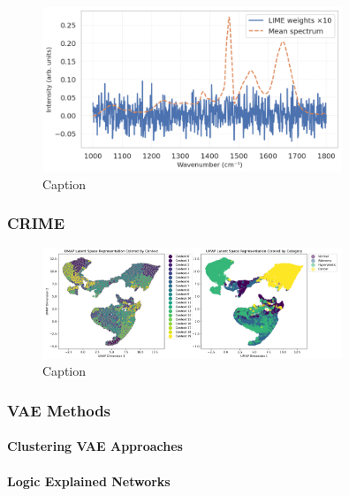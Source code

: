 \begin{figure}[htbp]
  \centering
  \includegraphics[width=0.8\textwidth]{Images/lime_demo.png}
  \caption{Caption}
  \label{fig:my-label}
\end{figure}

\subsubsection{CRIME}
\begin{figure}[htbp]
  \centering
  \includegraphics[width=0.8\textwidth]{Images/crime_umap.png}
  \caption{Caption}
  \label{fig:my-label}
\end{figure}
\subsubsection{VAE Methods}
\paragraph{Clustering VAE Approaches}
\paragraph{Logic Explained Networks}